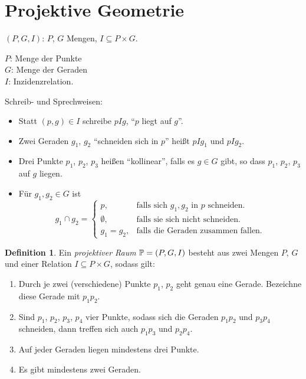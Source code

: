 \documentclass[
 a4paper,
 12pt,
 parskip=half
 ]{scrartcl}
\theoremstyle{plain}
\theoremstyle{definition}
\newtheorem*{defn*}{Definition}
\begin{document}


\section{Projektive Geometrie}
$(P,G,I)$: $P$, $G$ Mengen, $I \subseteq P \times G$.

$P$: Menge der Punkte \\
$G$: Menge der Geraden \\
$I$: Inzidenzrelation.

Schreib- und Sprechweisen:
\begin{itemize}
 \item Statt $(p,g) \in I$ schreibe $pIg$, ``$p$ liegt auf $g$''. 
 \item Zwei Geraden $g_1$, $g_2$ ``schneiden sich in $p$'' heißt $pIg_1$ und $pIg_2$. 
 \item Drei Punkte $p_1$, $p_2$, $p_3$ heißen ``kollinear'', falls es $g \in G$ gibt, so dass $p_1$, $p_2$, $p_3$ auf $g$ liegen.
 \item Für $g_1, g_2 \in G$ ist
  \[ g_1 \cap g_2 = \begin{cases}
                   p, &\text{falls sich } g_1, g_2 \text{ in } p \text{ schneiden.} \\
                   \emptyset, &\text{falls sie sich nicht schneiden.} \\
                   g_1 = g_2, &\text{falls die Geraden zusammen fallen.}
                  \end{cases} \]
\end{itemize}

\begin{defn*}
 Ein \emph{projektiver Raum} $\mathbb{P} = (P,G,I)$ besteht aus zwei Mengen $P$, $G$ und einer Relation $I \subseteq P \times G$, sodass gilt:
 \begin{enumerate}[{A}1)]
  \item Durch je zwei (verschiedene) Punkte $p_1$, $p_2$ geht genau eine Gerade. Bezeichne diese Gerade mit $p_1 p_2$.
  \item Sind $p_1$, $p_2$, $p_3$, $p_4$ vier Punkte, sodass sich die Geraden $p_1 p_2$ und $p_3 p_4$ schneiden, dann treffen sich auch $p_1 p_3$ und $p_2 p_4$.
  \item Auf jeder Geraden liegen mindestens drei Punkte.
  \item Es gibt mindestens zwei Geraden.
 \end{enumerate}
\end{defn*}
\end{document}
